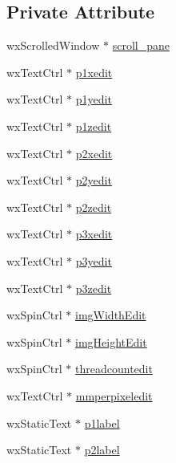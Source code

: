 \subsection*{Private Attribute}
\begin{DoxyCompactItemize}
\item 
wx\-Scrolled\-Window $\ast$ \hyperlink{classGUICutRenderWindow_a28c430f7145860ba3265fa9b8417923d}{scroll\-\_\-pane}
\item 
wx\-Text\-Ctrl $\ast$ \hyperlink{classGUICutRenderWindow_a509b5ca573c287e3863e952ec629fa7b}{p1xedit}
\item 
wx\-Text\-Ctrl $\ast$ \hyperlink{classGUICutRenderWindow_a93e837c15d8c6e7f420fd457c49024f2}{p1yedit}
\item 
wx\-Text\-Ctrl $\ast$ \hyperlink{classGUICutRenderWindow_a5843efcb13e1d56ea95932d052e5666a}{p1zedit}
\item 
wx\-Text\-Ctrl $\ast$ \hyperlink{classGUICutRenderWindow_a5d2bcd96c6fdb8d629583c5d40ccdbcc}{p2xedit}
\item 
wx\-Text\-Ctrl $\ast$ \hyperlink{classGUICutRenderWindow_a8ec4550ec7d30a8ad3c4c1e5dfcb8dce}{p2yedit}
\item 
wx\-Text\-Ctrl $\ast$ \hyperlink{classGUICutRenderWindow_affad4d5ff6cf42dd585a1a5f0e050075}{p2zedit}
\item 
wx\-Text\-Ctrl $\ast$ \hyperlink{classGUICutRenderWindow_a3382e7bd629988774c4f5e81bf66ca7e}{p3xedit}
\item 
wx\-Text\-Ctrl $\ast$ \hyperlink{classGUICutRenderWindow_a5f908b41a4d9db847cd89c0a3c52b61a}{p3yedit}
\item 
wx\-Text\-Ctrl $\ast$ \hyperlink{classGUICutRenderWindow_ac4c2f8825a9596f32093f0ac08a7848d}{p3zedit}
\item 
wx\-Spin\-Ctrl $\ast$ \hyperlink{classGUICutRenderWindow_a211043ba4bd60862a9fbfe1186c40875}{img\-Width\-Edit}
\item 
wx\-Spin\-Ctrl $\ast$ \hyperlink{classGUICutRenderWindow_a4daa569840f00756e6781ad2d87aef5b}{img\-Height\-Edit}
\item 
wx\-Spin\-Ctrl $\ast$ \hyperlink{classGUICutRenderWindow_ae48406dc8c80240904ca7040b7b3fbf1}{threadcountedit}
\item 
wx\-Text\-Ctrl $\ast$ \hyperlink{classGUICutRenderWindow_a76ced7f0bb7a2b08142aaf225f37c108}{mmperpixeledit}
\item 
wx\-Static\-Text $\ast$ \hyperlink{classGUICutRenderWindow_ac28961397f75c1d67dd1d983cda586f8}{p1label}
\item 
wx\-Static\-Text $\ast$ \hyperlink{classGUICutRenderWindow_adc1202b42f220ea7b8a8830f4d9d322a}{p2label}

\end{DoxyCompactItemize}
